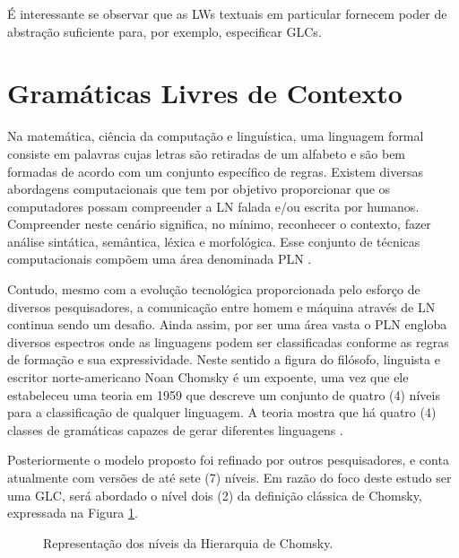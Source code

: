 É interessante se observar que as \acp{LW} textuais em particular fornecem poder de abstração suficiente para, por exemplo, especificar \acp{GLC}.

\section{Gramáticas Livres de Contexto} \label{ssec:GLC}

Na matemática, ciência da computação e linguística, uma linguagem formal consiste em palavras cujas letras são retiradas de um alfabeto e são bem formadas de acordo com um conjunto específico de regras. 
Existem diversas abordagens computacionais que tem por objetivo proporcionar que os computadores possam compreender a \ac{LN} falada e/ou escrita por humanos. 
Compreender neste cenário significa, no mínimo, reconhecer o contexto, fazer análise sintática, semântica, léxica e morfológica. 
Esse conjunto de técnicas computacionais compõem uma área denominada \ac{PLN} \cite{Jurafsky:2009}.

Contudo, mesmo com a evolução tecnológica proporcionada pelo esforço de diversos pesquisadores, a comunicação entre homem e máquina através de \ac{LN} continua sendo um desafio. 
Ainda assim, por ser uma área vasta o \ac{PLN} engloba diversos espectros onde as linguagens podem ser classificadas conforme as regras de formação e sua expressividade. 
Neste sentido a figura do filósofo, linguista e escritor norte-americano Noan Chomsky é um expoente, uma vez que ele estabeleceu uma teoria em 1959 que descreve um conjunto de quatro (4) níveis para a classificação de qualquer linguagem. 
A teoria mostra que há quatro (4) classes de gramáticas capazes de gerar diferentes linguagens \cite{Linz:2016}.

Posteriormente o modelo proposto foi refinado por outros pesquisadores, e conta atualmente com versões de até sete (7) níveis. 
Em razão do foco deste estudo ser uma \ac{GLC}, será abordado o nível dois (2) da definição clássica de Chomsky, expressada na Figura \ref{fig:Chomsky}.

\begin{figure}[!htb]
    \centering
    \caption{Representação dos níveis da Hierarquia de Chomsky.}
    \label{fig:Chomsky}
    
\end{figure}

